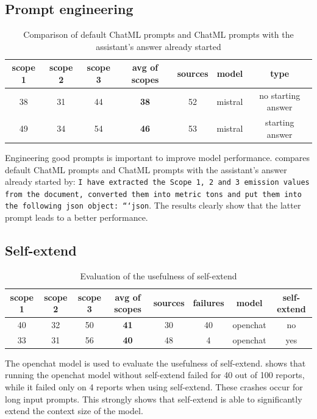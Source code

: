 \documentclass[]{article}
\begin{document}
	\subsection{Prompt engineering}
	
	\begin{table}[h!]
		\centering
		\begin{tabular}{@{}ccccccc@{}}
			\toprule
			scope 1 & scope 2 & scope 3 & avg of scopes & sources & model & type \\ \midrule
			38 & 31 & 44 & \textbf{38} & 52 & mistral & no starting answer \\
			49 & 34 & 54 & \textbf{46} & 53 & mistral & starting answer \\ \bottomrule
		\end{tabular}
		\caption{Comparison of default ChatML prompts and ChatML prompts with the assistant's answer already started}
		\label{tab:prompt_comparison}
	\end{table}
	
	Engineering good prompts is important to improve model performance.  compares default ChatML prompts and ChatML prompts with the assistant's answer already started by: \texttt{I have extracted the Scope 1, 2 and 3 emission values from the document, converted them into metric tons and put them into the following json object: ```json}. The results clearly show that the latter prompt leads to a better performance.
	
	\subsection{Self-extend}
	
	\begin{table}[h!]
		\centering
		\begin{tabular}{@{}cccccccc@{}}
			\toprule
			scope 1 & scope 2 & scope 3 & avg of scopes & sources & failures & model & self-extend \\ \midrule
			40 & 32 & 50 & \textbf{41} & 30 & 40 & openchat & no \\
			33 & 31 & 56 & \textbf{40} & 48 & 4 & openchat & yes \\ \bottomrule
		\end{tabular}
		\caption{Evaluation of the usefulness of self-extend}
		\label{tab:self_extend}
	\end{table}
	
	The openchat model is used to evaluate the usefulness of self-extend.  shows that running the openchat model without self-extend failed for 40 out of 100 reports, while it failed only on 4 reports when using self-extend. These crashes occur for long input prompts. This strongly shows that self-extend is able to significantly extend the context size of the model.
	
\end{document}
